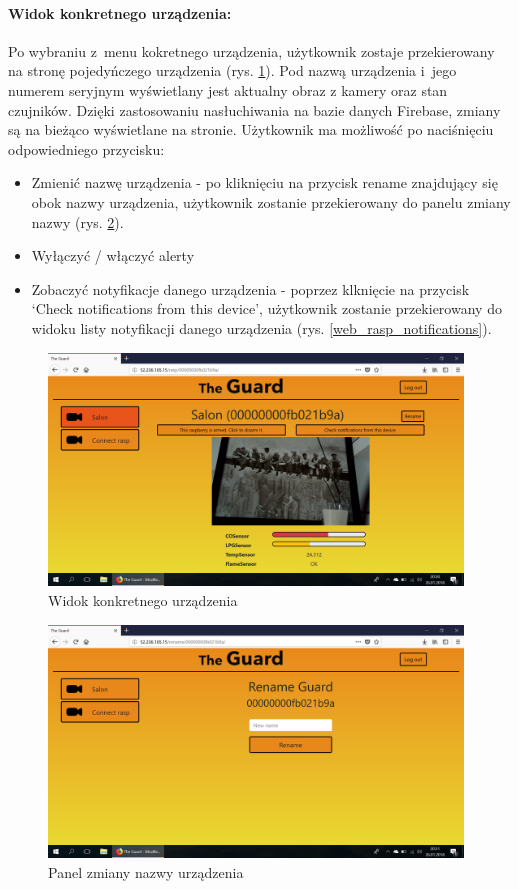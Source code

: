 \paragraph{Widok konkretnego urządzenia:} Po wybraniu z~menu kokretnego urządzenia, użytkownik zostaje przekierowany na stronę pojedyńczego urządzenia (rys. \ref{web_rasp_view}). Pod nazwą urządzenia i~jego numerem seryjnym wyświetlany jest aktualny obraz z kamery oraz stan czujników. Dzięki zastosowaniu nasłuchiwania na bazie danych Firebase, zmiany są na bieżąco wyświetlane na stronie. Użytkownik ma możliwość po naciśnięciu odpowiedniego przycisku:
\begin{itemize}
\item Zmienić nazwę urządzenia - po kliknięciu na przycisk rename znajdujący się obok nazwy urządzenia, użytkownik zostanie przekierowany do panelu zmiany nazwy (rys. \ref{web_rasp_rename}).
\item Wyłączyć / włączyć alerty 
\item Zobaczyć notyfikacje danego urządzenia - poprzez klknięcie na przycisk `Check notifications from this device', użytkownik zostanie przekierowany do widoku listy notyfikacji danego urządzenia (rys. \ref{web_rasp_notifications}).
\end{itemize}

\begin{figure}[ht]
	\centering
	\includegraphics[width=11cm]{web_screenshots/rasp_view.png}
	\caption{Widok konkretnego urządzenia}
	\label{web_rasp_view}
\end{figure}

\begin{figure}[ht]
	\centering
	\includegraphics[width=11cm]{web_screenshots/rasp_rename.png}
	\caption{Panel zmiany nazwy urządzenia}
	\label{web_rasp_rename}
\end{figure}

